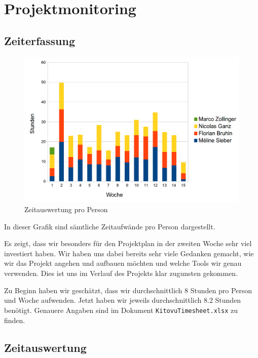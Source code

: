 \documentclass[a4paper]{article}
\let\oldsection\section
\renewcommand\section{\clearpage\oldsection}
\begin{document}
\section{Projektmonitoring}

\subsection{Zeiterfassung}

\begin{figure}[H]
  \includegraphics[width=\linewidth]{./img/time_per_person.png}
  \caption{Zeitauswertung pro Person\protect\footnotemark}
\end{figure}

In dieser Grafik sind sämtliche Zeitaufwände pro Person dargestellt.

Es zeigt, dass wir besonders für den Projektplan in der zweiten Woche sehr viel investiert haben.
Wir haben uns dabei bereits sehr viele Gedanken gemacht, wie wir das Projekt angehen und aufbauen möchten und welche Tools wir genau verwenden. Dies ist uns im Verlauf des Projekts klar zugunsten gekommen.

Zu Beginn haben wir geschätzt, dass wir durchschnittlich 8 Stunden pro Person
und Woche aufwenden.
Jetzt haben wir jeweils durchschnittlich 8.2 Stunden benötigt.
Genauere Angaben sind im Dokument \verb|KitovuTimesheet.xlsx| zu finden.

\subsection{Zeitauswertung}
\end{document}

